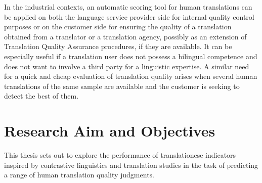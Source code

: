 In the industrial contexts, an automatic scoring tool for human translations can be applied on both the language service provider side for internal quality control purposes or on the customer side for ensuring the quality of a translation obtained from a translator or a translation agency, possibly as an extension of Translation Quality Assurance procedures, if they are available. It can be especially useful if a translation user does not possess a bilingual competence and does not want to involve a third party for a linguistic expertise. A similar need for a quick and cheap evaluation of translation quality arises when several human translations of the same sample are available and the customer is seeking to detect the best of them. 

\section{\label{sec:task}Research Aim and Objectives}
This thesis sets out to explore the performance of translationese indicators inspired by contrastive linguistics and translation studies in the task of predicting a range of human translation quality judgments.

